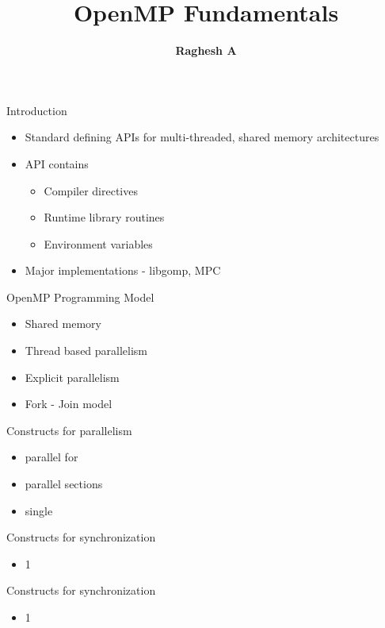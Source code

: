 \documentclass[14pt]{beamer}
\title{OpenMP Fundamentals}
\author{\textbf{Raghesh A}}
\date
\begin{document}
\begin{frame}
\titlepage
\end{frame}

\begin{frame}{Introduction}
\begin{itemize}
\item Standard defining APIs for multi-threaded, shared memory architectures
\item API contains
  \begin{itemize}
  \item Compiler directives
  \item Runtime library routines
  \item Environment variables
  \end{itemize}
\item Major implementations - libgomp, MPC
\end{itemize}
\end{frame}

\begin{frame}{OpenMP Programming Model}
\begin{itemize}
\item Shared memory
\item Thread based parallelism
\item Explicit parallelism
\item Fork - Join model
\end{itemize}
\end{frame}


\begin{frame}{Constructs for parallelism }
\begin{itemize}
\item parallel for
\item parallel sections
\item single
\end{itemize}
\end{frame}

\begin{frame}{Constructs for synchronization}
\begin{itemize}
\item 1
\end{itemize}
\end{frame}

\begin{frame}{Constructs for synchronization}
\begin{itemize}
\item 1
\end{itemize}
\end{frame}
\end{document}
